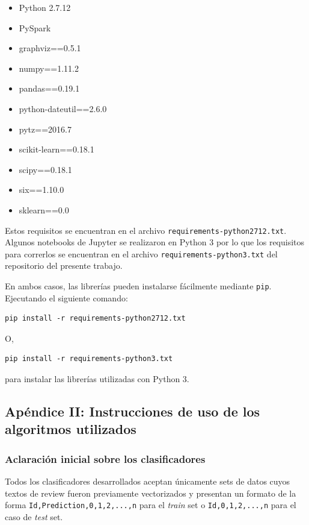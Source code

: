 \documentclass[10pt,a4paper]{article}
\begin{document}
\begin{itemize}
    \item Python 2.7.12
    \item PySpark
    \item graphviz==0.5.1
    \item numpy==1.11.2
    \item pandas==0.19.1
    \item python-dateutil==2.6.0
    \item pytz==2016.7
    \item scikit-learn==0.18.1
    \item scipy==0.18.1
    \item six==1.10.0
    \item sklearn==0.0
\end{itemize}


Estos requisitos se encuentran en el archivo \texttt{requirements-python2712.txt}. 
Algunos notebooks de Jupyter se realizaron en Python 3 por lo que los requisitos para correrlos se encuentran en el archivo \texttt{requirements-python3.txt} del repositorio del presente trabajo.

En ambos casos, las librerías pueden instalarse fácilmente mediante \texttt{pip}. Ejecutando el siguiente comando:

\begin{lstlisting}
pip install -r requirements-python2712.txt
\end{lstlisting}

O,

\begin{lstlisting}
pip install -r requirements-python3.txt
\end{lstlisting}

para instalar las librerías utilizadas con Python 3.
\subsection{Apéndice II: Instrucciones de uso de los algoritmos utilizados}
\subsubsection{Aclaración inicial sobre los clasificadores}
Todos los clasificadores desarrollados aceptan únicamente sets de datos cuyos textos de review fueron previamente vectorizados y presentan un formato de la forma \texttt{Id,Prediction,0,1,2,...,n} para el \textit{train} set o \texttt{Id,0,1,2,...,n} para el caso de \textit{test} set.
\end{document}
